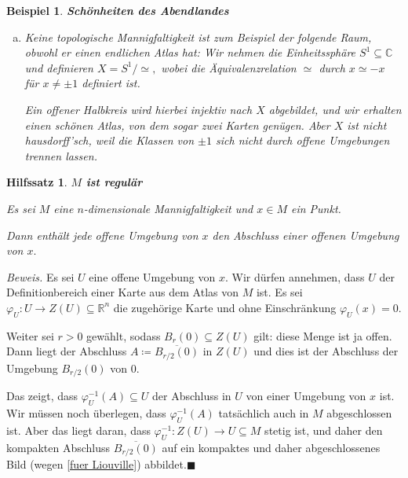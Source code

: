 \documentclass[12pt]{scrbook}   %
\newtheorem{hilfsX}[alles]{Hilfssatz}
\newenvironment{hilfs}[1]{\begin{hilfsX}{\bf #1}\par}{\end{hilfsX}}
\newtheorem{bspX}[alles]{Beispiel}
\newenvironment{bsp}[1]{\begin{bspX}{\bf #1}\par\rm}{\end{bspX}}
\newcommand{\qed}{\phantom{.}\hfill{$\blacksquare$}}
\newcommand{\da}{\coloneqq}
\begin{document}
\begin{bsp}{Schönheiten des Abendlandes}
\begin{enumerate}[a)]
Aber: $X$ ist nicht hausdorff’sch!. Eine offene Umgebung von $[(0,0)]$ enthält $[(x,0)]$ für $|x|<\delta$ für ein $\delta > 0$. Ebenso enthält eine offene Umgebung von $[(0,1)]$ die Punkte $[(x,0)]$ für $|x|<\varepsilon$ für ein $\varepsilon > 0$. Für $x\ne 0$ ist aber $[(x,1)]= [(x,0)]$, also sind diese beiden offenen Umgebungen nicht disjunkt.

\item Keine topologische Mannigfaltigkeit ist zum Beispiel der folgende
Raum, obwohl er einen endlichen Atlas hat: Wir nehmen die Einheitssphäre 
$S^1\subseteq \mathbb C$ und definieren $X=S^1/\simeq,$
wobei die Äquivalenzrelation $\simeq$ durch $x\simeq -x$ für $x\neq 
\pm1$ definiert ist. 

Ein offener Halbkreis wird hierbei injektiv nach $X$ abgebildet, und wir 
erhalten einen schönen Atlas, von dem sogar zwei Karten genügen. Aber $X$ 
ist nicht hausdorff'sch, weil die Klassen von $\pm 1$ sich nicht durch offene
Umgebungen trennen lassen.
\end{enumerate}
\end{bsp}

\begin{hilfs}{$M$ ist regul\"ar}

Es sei $M$ eine $n$-dimensionale Mannigfaltigkeit und $x\in M$
ein Punkt.


Dann enth\"alt jede offene Umgebung von $x$ den Abschluss einer offenen 
Umgebung von $x.$

\end{hilfs}

{\it Beweis.} Es sei $U$ eine offene Umgebung von $x.$ Wir d\"urfen annehmen, 
dass $U$ der Definitionbereich einer Karte aus dem Atlas von $M$ ist.
Es sei $\varphi_U:U\longrightarrow Z(U)\subseteq \mathbb R^n$ die zugeh\"orige
Karte und ohne Einschr\"ankung $\varphi_U(x) = 0.$

Weiter sei $r>0$ gew\"ahlt, sodass $B_r(0)\subseteq Z(U)$ gilt: diese Menge ist
ja offen. Dann liegt der Abschluss $A\da\overline{B_{r/2}(0)}$ in $Z(U)$ und 
dies ist der Abschluss der Umgebung $B_{r/2}(0)$ von $0$. 

Das zeigt, dass $\varphi_U^{-1}(A)\subseteq U$ der Abschluss in $U$ von einer
Umgebung von $x$ ist. Wir m\"ussen noch \"uberlegen, dass $\varphi_U^{-1}(A)$
tats\"achlich auch in $M$ abgeschlossen ist. Aber das liegt daran, dass
$\varphi_U^{-1} : Z(U) \longrightarrow U\subseteq M$ stetig ist, und daher 
den kompakten Abschluss $\overline{B_{r/2}(0)}$ auf ein kompaktes und daher
abgeschlossenes Bild (wegen \ref{fuer Liouville}) abbildet.\qed
\end{document}
